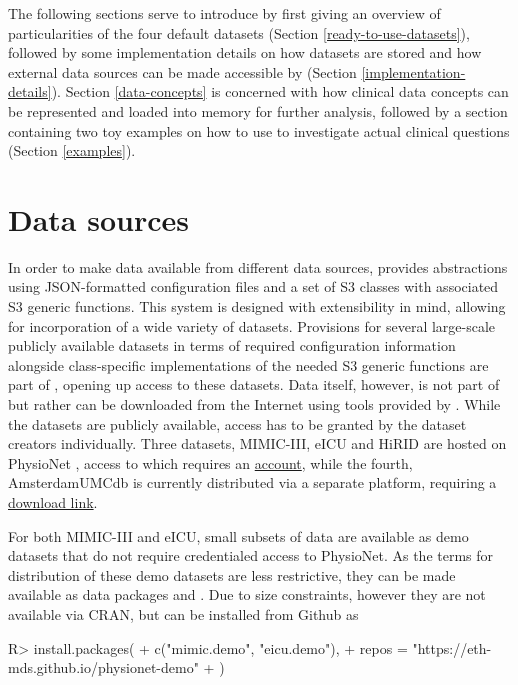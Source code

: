 \documentclass[
]{jss}
\begin{document}
The following sections serve to introduce  by first giving an
overview of particularities of the four default datasets (Section
\ref{ready-to-use-datasets}), followed by some implementation details on
how datasets are stored and how external data sources can be made
accessible by  (Section \ref{implementation-details}). Section
\ref{data-concepts} is concerned with how clinical data concepts can be
represented and loaded into memory for further analysis, followed by a
section containing two toy examples on how to use  to
investigate actual clinical questions (Section \ref{examples}).

\hypertarget{data-sources}{%
\section{Data sources}\label{data-sources}}

In order to make data available from different data sources, 
provides abstractions using JSON-formatted configuration files and a set
of S3 classes with associated S3 generic functions. This system is
designed with extensibility in mind, allowing for incorporation of a
wide variety of datasets. Provisions for several large-scale publicly
available datasets in terms of required configuration information
alongside class-specific implementations of the needed S3 generic
functions are part of , opening up access to these datasets.
Data itself, however, is not part of  but rather can be
downloaded from the Internet using tools provided by . While
the datasets are publicly available, access has to be granted by the
dataset creators individually. Three datasets, MIMIC-III, eICU and HiRID
are hosted on PhysioNet \citep{goldberger2000}, access to which requires
an \href{https://physionet.org/register/}{account}, while the fourth,
AmsterdamUMCdb is currently distributed via a separate platform,
requiring a
\href{https://amsterdammedicaldatascience.nl/\#amsterdamumcdb}{download
link}.

For both MIMIC-III and eICU, small subsets of data are available as demo
datasets that do not require credentialed access to PhysioNet. As the
terms for distribution of these demo datasets are less restrictive, they
can be made available as data packages  and
. Due to size constraints, however they are not available
via CRAN, but can be installed from Github as

\begin{CodeChunk}
\begin{CodeInput}
R> install.packages(
+   c("mimic.demo", "eicu.demo"),
+   repos = "https://eth-mds.github.io/physionet-demo"
+ )
\end{CodeInput}
\end{CodeChunk}
\end{document}

